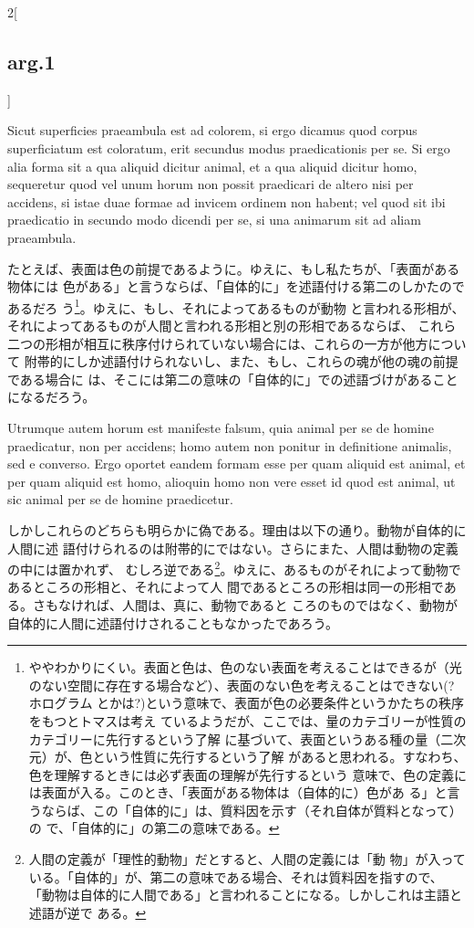 \documentclass[paper=a4paper,fontsize=10pt,jafontsize=9pt,titlepage]{jlreq}
\begin{document}
\begin{paracol}{2}[\subsection{arg.1}]
\switchcolumn*

 Sicut superficies praeambula est ad colorem, si ergo dicamus quod corpus
 superficiatum est coloratum, erit secundus modus praedicationis per se. Si ergo
 alia forma sit a qua aliquid dicitur animal, et a qua aliquid dicitur homo,
 sequeretur quod vel unum horum non possit praedicari de altero nisi per
 accidens, si istae duae formae ad invicem ordinem non habent; vel quod sit ibi
 praedicatio in secundo modo dicendi per se, si una animarum sit ad aliam
 praeambula.

\switchcolumn

たとえば、表面は色の前提であるように。ゆえに、もし私たちが、「表面がある物体には
色がある」と言うならば、「自体的に」を述語付ける第二のしかたのであるだろ
う\footnote{ややわかりにくい。表面と色は、色のない表面を考えることはできるが（光
  のない空間に存在する場合など）、表面のない色を考えることはできない(?ホログラム
  とかは?)という意味で、表面が色の必要条件というかたちの秩序をもつとトマスは考え
  ているようだが、ここでは、量のカテゴリーが性質のカテゴリーに先行するという了解
  に基づいて、表面というある種の量（二次元）が、色という性質に先行するという了解
  があると思われる。すなわち、色を理解するときには必ず表面の理解が先行するという
  意味で、色の定義には表面が入る。このとき、「表面がある物体は（自体的に）色があ
  る」と言うならば、この「自体的に」は、質料因を示す（それ自体が質料となって）の
  で、「自体的に」の第二の意味である。}。ゆえに、もし、それによってあるものが動物
と言われる形相が、それによってあるものが人間と言われる形相と別の形相であるならば、
これら二つの形相が相互に秩序付けられていない場合には、これらの一方が他方について
附帯的にしか述語付けられないし、また、もし、これらの魂が他の魂の前提である場合に
は、そこには第二の意味の「自体的に」での述語づけがあることになるだろう。
 
\switchcolumn*

 Utrumque autem horum est manifeste falsum, quia animal per se de homine
 praedicatur, non per accidens; homo autem non ponitur in definitione animalis,
 sed e converso. Ergo oportet eandem formam esse per quam aliquid est animal, et
 per quam aliquid est homo, alioquin homo non vere esset id quod est animal, ut
 sic animal per se de homine praedicetur.

\switchcolumn

しかしこれらのどちらも明らかに偽である。理由は以下の通り。動物が自体的に人間に述
語付けられるのは附帯的にではない。さらにまた、人間は動物の定義の中には置かれず、
むしろ逆である\footnote{人間の定義が「理性的動物」だとすると、人間の定義には「動
  物」が入っている。「自体的」が、第二の意味である場合、それは質料因を指すので、
  「動物は自体的に人間である」と言われることになる。しかしこれは主語と述語が逆で
  ある。}。ゆえに、あるものがそれによって動物であるところの形相と、それによって人
間であるところの形相は同一の形相である。さもなければ、人間は、真に、動物であると
ころのものではなく、動物が自体的に人間に述語付けされることもなかったであろう。
 

\end{paracol}
\end{document}
